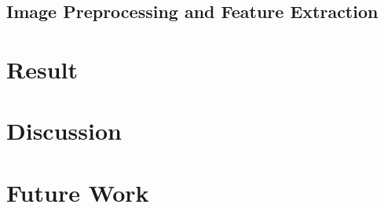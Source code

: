 \documentclass[11pt]{article}
\begin{document}
\subsection{Image Preprocessing and Feature Extraction}\label{sec:image_preprocessing}


\section{Result}\label{sec:result}



\section{Discussion}

\section{Future Work}


\pagebreak

\appendix


\end{document}
